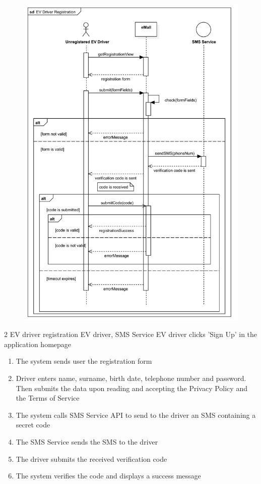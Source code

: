 \usecase
{
    \begin{figure}[H]
        \centering
        \includegraphics[scale=0.9]{src/sequence_diagram/evDriverRegistration.png}
    \end{figure}
}
{2}
{EV driver registration}
{EV driver, SMS Service}
{EV driver clicks 'Sign Up' in the application homepage}
{
    \begin{enumerate}
        \item The system sends user the registration form
        \item Driver enters name, surname, birth date, telephone number and password. Then submits the data upon reading and accepting the Privacy Policy and the Terms of Service
        \item The system calls SMS Service API to send to the driver an SMS containing a secret code
        \item The SMS Service sends the SMS to the driver
        \item The driver submits the received verification code
        \item The system verifies the code and displays a success message
    \end{enumerate}
}

